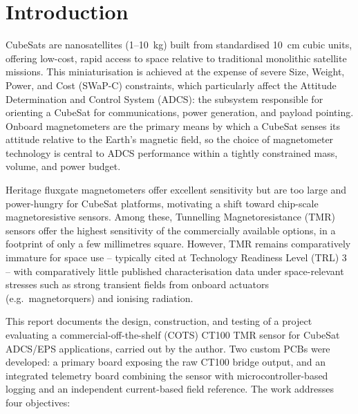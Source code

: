 \documentclass[12pt,a4paper]{article}
\begin{document}
\clearpage


\section{Introduction}
\label{sec:intro}

CubeSats are nanosatellites (1--10~kg) built from standardised 10~cm cubic units, offering low-cost, rapid access to space relative to traditional monolithic satellite missions. This miniaturisation is achieved at the expense of severe Size, Weight, Power, and Cost (SWaP-C) constraints, which particularly affect the Attitude Determination and Control System (ADCS): the subsystem responsible for orienting a CubeSat for communications, power generation, and payload pointing. Onboard magnetometers are the primary means by which a CubeSat senses its attitude relative to the Earth's magnetic field, so the choice of magnetometer technology is central to ADCS performance within a tightly constrained mass, volume, and power budget.

Heritage fluxgate magnetometers offer excellent sensitivity but are too large and power-hungry for CubeSat platforms, motivating a shift toward chip-scale magnetoresistive sensors. Among these, Tunnelling Magnetoresistance (TMR) sensors offer the highest sensitivity of the commercially available options, in a footprint of only a few millimetres square. However, TMR remains comparatively immature for space use -- typically cited at Technology Readiness Level (TRL) 3 -- with comparatively little published characterisation data under space-relevant stresses such as strong transient fields from onboard actuators (e.g.\ magnetorquers) and ionising radiation.

This report documents the design, construction, and testing of a project evaluating a commercial-off-the-shelf (COTS) CT100 TMR sensor for CubeSat ADCS/EPS applications, carried out by the author. Two custom PCBs were developed: a primary board exposing the raw CT100 bridge output, and an integrated telemetry board combining the sensor with microcontroller-based logging and an independent current-based field reference. The work addresses four objectives:
\end{document}
